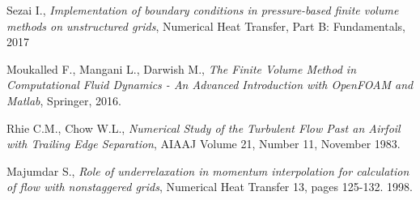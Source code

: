 \documentclass[11pt,letterpaper,titlepage]{article}
\numberwithin{equation}{section}
\begin{document}
\newpage
{}
\begin{thebibliography}{1}
    
     Sezai I., {\em Implementation of boundary conditions in pressure-based finite volume methods on unstructured grids}, Numerical Heat Transfer, Part B: Fundamentals, 2017
    
     Moukalled F., Mangani L., Darwish M., {\em The Finite Volume Method in Computational Fluid Dynamics - An Advanced Introduction with OpenFOAM and Matlab}, Springer, 2016.
    
     Rhie C.M., Chow W.L., {\em Numerical Study of the Turbulent Flow Past an Airfoil with Trailing Edge Separation}, AIAAJ Volume 21, Number 11, November 1983.
    
     Majumdar S., {\em Role of underrelaxation in momentum interpolation for calculation of flow with nonstaggered grids}, Numerical Heat Transfer 13, pages 125-132. 1998.
    
    
\end{thebibliography}
\end{document}
